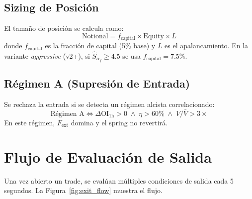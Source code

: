 \documentclass[11pt,a4paper]{article}
\newcommand{\score}{\hat{S}_{\alpha_f}}
\begin{document}
\subsection{Sizing de Posici\'on}

El tama\~no de posici\'on se calcula como:
\begin{equation}
\text{Notional} = f_{\text{capital}} \times \text{Equity} \times L
\label{eq:sizing}
\end{equation}
donde $f_{\text{capital}}$ es la fracci\'on de capital (5\% base) y $L$ es el
apalancamiento. En la variante \textit{aggressive} (v2+), si $\score \geq 4.5$
se usa $f_{\text{capital}} = 7.5\%$.

\subsection{R\'egimen A (Supresi\'on de Entrada)}

Se rechaza la entrada si se detecta un r\'egimen alcista correlacionado:
\begin{equation}
\text{R\'egimen A} \iff \Delta\text{OI}_{1\text{h}} > 0 \;\wedge\; \eta > 60\% \;\wedge\; V/\bar{V} > 3\times
\end{equation}
En este r\'egimen, $F_{\text{ext}}$ domina y el spring no revertir\'a.


\section{Flujo de Evaluaci\'on de Salida}
\label{sec:exit}

Una vez abierto un trade, se eval\'uan m\'ultiples condiciones de salida
cada 5 segundos. La Figura~\ref{fig:exit_flow} muestra el flujo.
\end{document}

